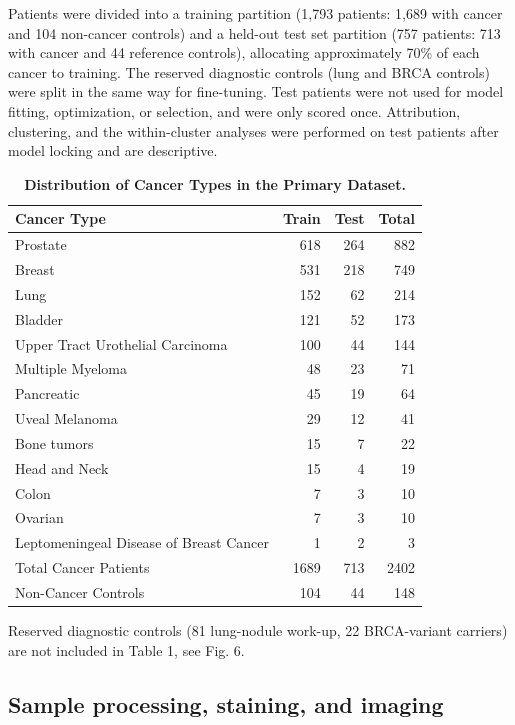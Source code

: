 \documentclass[11pt]{article}
\begin{document}
Patients were divided into a training partition (1,793 patients: 1,689 with cancer and 104 non-cancer controls) and a held-out test set partition (757 patients: 713 with cancer and 44 reference controls), allocating approximately 70\% of each cancer to training. The reserved diagnostic controls (lung and BRCA controls) were split in the same way for fine-tuning. Test patients were not used for model fitting, optimization, or selection, and were only scored once. Attribution, clustering, and the within-cluster analyses were performed on test patients after model locking and are descriptive.

\begin{table}[!tbp]
\centering
\caption{\textbf{Distribution of Cancer Types in the Primary Dataset.}}
\label{tab:1}
\begin{tabular}{lrrr}
\toprule
Cancer Type & Train & Test & Total \\
\midrule
Prostate & 618 & 264 & 882 \\
Breast & 531 & 218 & 749 \\
Lung & 152 & 62 & 214 \\
Bladder & 121 & 52 & 173 \\
Upper Tract Urothelial Carcinoma & 100 & 44 & 144 \\
Multiple Myeloma & 48 & 23 & 71 \\
Pancreatic & 45 & 19 & 64 \\
Uveal Melanoma & 29 & 12 & 41 \\
Bone tumors & 15 & 7 & 22 \\
Head and Neck & 15 & 4 & 19 \\
Colon & 7 & 3 & 10 \\
Ovarian & 7 & 3 & 10 \\
Leptomeningeal Disease of Breast Cancer & 1 & 2 & 3 \\
\midrule
Total Cancer Patients & 1689 & 713 & 2402 \\
Non-Cancer Controls & 104 & 44 & 148 \\
\bottomrule
\end{tabular}

\vspace{4pt}
\begin{minipage}{0.8\textwidth}\small
Reserved diagnostic controls (81 lung-nodule work-up, 22 BRCA-variant carriers) are not included in Table 1, see Fig. 6.
\end{minipage}
\end{table}

\subsection*{Sample processing, staining, and imaging}
\end{document}
